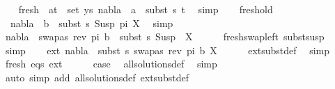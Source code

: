 \begin{isabellebody}
\ \ \isamarkupfalse%
\ fresh{\isacharcolon}{\kern0pt}\ {\isachardoublequoteopen}{\isasymforall}\ {\isacharparenleft}{\kern0pt}a{\isacharcomma}{\kern0pt}t{\isacharparenright}{\kern0pt}\ {\isasymin}\ set\ ys{\isachardot}{\kern0pt}\ nabla{}\ {\isasymturnstile}\ a\ {\isasymsharp}\ subst\ s{}\ t{\isachardoublequoteclose}\ \isamarkupfalse%
\ simp\isanewline
\ \ \isamarkupfalse%
\ fresh{\isacharunderscore}{\kern0pt}old\ \isamarkupfalse%
\isanewline
\ \ {\isachardoublequoteopen}nabla{}\ {\isasymturnstile}\ b\ {\isasymsharp}\ subst\ s{}\ {\isacharparenleft}{\kern0pt}Susp\ pi\ X{\isacharparenright}{\kern0pt}{\isachardoublequoteclose}\ \isamarkupfalse%
\ simp\isanewline
\ \ \isamarkupfalse%
\ {\isachardoublequoteopen}nabla{}\ {\isasymturnstile}\ swapas\ {\isacharparenleft}{\kern0pt}rev\ pi{\isacharparenright}{\kern0pt}\ b\ {\isasymsharp}\ subst\ s{}\ {\isacharparenleft}{\kern0pt}Susp\ {\isacharbrackleft}{\kern0pt}{\isacharbrackright}{\kern0pt}\ X{\isacharparenright}{\kern0pt}{\isachardoublequoteclose}\isanewline
\ \ \ \ \isamarkupfalse%
\ fresh{\isacharunderscore}{\kern0pt}swap{\isacharunderscore}{\kern0pt}left\ subst{\isacharunderscore}{\kern0pt}susp\ \isamarkupfalse%
\ simp\isanewline
\ \ \isamarkupfalse%
\ ext{\isacharcolon}{\kern0pt}\ {\isachardoublequoteopen}nabla{}\ {\isasymTurnstile}\ {\isacharparenleft}{\kern0pt}subst\ s{}{\isacharparenright}{\kern0pt}\ {\isacharbraceleft}{\kern0pt}{\isacharparenleft}{\kern0pt}swapas\ {\isacharparenleft}{\kern0pt}rev\ pi{\isacharparenright}{\kern0pt}\ b{\isacharcomma}{\kern0pt}\ X{\isacharparenright}{\kern0pt}{\isacharbraceright}{\kern0pt}{\isachardoublequoteclose}\isanewline
\ \ \ \ \isamarkupfalse%
\ ext{\isacharunderscore}{\kern0pt}subst{\isacharunderscore}{\kern0pt}def\ \isamarkupfalse%
\ simp\isanewline
\ \ \isamarkupfalse%
\ fresh\ eqs\ ext\isanewline
\ \ \ \ \isamarkupfalse%
\ {\isacharquery}{\kern0pt}case\ \isamarkupfalse%
\ all{\isacharunderscore}{\kern0pt}solutions{\isacharunderscore}{\kern0pt}def\ \isamarkupfalse%
\ simp\isanewline
{}\isamarkupfalse%
\ {\isacharparenleft}{\kern0pt}auto\ simp\ add{\isacharcolon}{\kern0pt}\ all{\isacharunderscore}{\kern0pt}solutions{\isacharunderscore}{\kern0pt}def\ ext{\isacharunderscore}{\kern0pt}subst{\isacharunderscore}{\kern0pt}def{\isacharparenright}{\kern0pt}%

\end{isabellebody}
